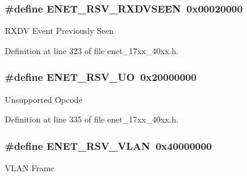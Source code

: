 \subsubsection[{\texorpdfstring{E\+N\+E\+T\+\_\+\+R\+S\+V\+\_\+\+R\+X\+D\+V\+S\+E\+EN}{ENET_RSV_RXDVSEEN}}]{\setlength{\rightskip}{0pt plus 5cm}\#define E\+N\+E\+T\+\_\+\+R\+S\+V\+\_\+\+R\+X\+D\+V\+S\+E\+EN~0x00020000}\hypertarget{group__ENET__17XX__40XX_ga96fe41c39224b433c1fe074b76161ec7}{}\label{group__ENET__17XX__40XX_ga96fe41c39224b433c1fe074b76161ec7}
R\+X\+DV Event Previously Seen 

Definition at line 323 of file enet\+\_\+17xx\+\_\+40xx.\+h.

\subsubsection[{\texorpdfstring{E\+N\+E\+T\+\_\+\+R\+S\+V\+\_\+\+UO}{ENET_RSV_UO}}]{\setlength{\rightskip}{0pt plus 5cm}\#define E\+N\+E\+T\+\_\+\+R\+S\+V\+\_\+\+UO~0x20000000}\hypertarget{group__ENET__17XX__40XX_gae2f33f7ad025f84d58c97ccb9fecf89a}{}\label{group__ENET__17XX__40XX_gae2f33f7ad025f84d58c97ccb9fecf89a}
Unsupported Opcode 

Definition at line 335 of file enet\+\_\+17xx\+\_\+40xx.\+h.

\subsubsection[{\texorpdfstring{E\+N\+E\+T\+\_\+\+R\+S\+V\+\_\+\+V\+L\+AN}{ENET_RSV_VLAN}}]{\setlength{\rightskip}{0pt plus 5cm}\#define E\+N\+E\+T\+\_\+\+R\+S\+V\+\_\+\+V\+L\+AN~0x40000000}\hypertarget{group__ENET__17XX__40XX_gabe88542e8c0a6fb6ea649cba94d2028d}{}\label{group__ENET__17XX__40XX_gabe88542e8c0a6fb6ea649cba94d2028d}
V\+L\+AN Frame 

